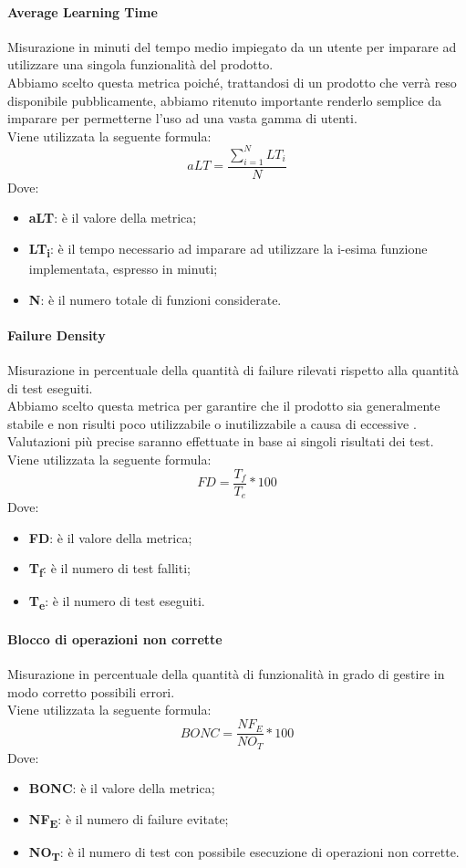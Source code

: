 \paragraph{Average Learning Time}\Spazio
Misurazione in minuti del tempo medio impiegato da un utente per imparare ad utilizzare una singola funzionalità del prodotto.
\\Abbiamo scelto questa metrica poiché, trattandosi di un prodotto che verrà reso disponibile pubblicamente, abbiamo ritenuto importante renderlo semplice da imparare per permetterne l'uso ad una vasta gamma di utenti.
\\Viene utilizzata la seguente formula:
$$aLT=\frac{\sum\limits_{i=1}^N{LT_i}}{N}$$
Dove:
\begin{itemize}
	\item{\textbf{aLT}: è il valore della metrica;}
	\item{\textbf{LT\textsubscript{i}}: è il tempo necessario ad imparare ad utilizzare la i-esima funzione implementata, espresso in minuti;}
	\item{\textbf{N}: è il numero totale di funzioni considerate.}
\end{itemize}

\paragraph{Failure Density}\Spazio
Misurazione in percentuale della quantità di failure rilevati rispetto alla quantità di test eseguiti.
\\Abbiamo scelto questa metrica per garantire che il prodotto sia generalmente stabile e non risulti poco utilizzabile o inutilizzabile a causa di eccessive . Valutazioni più precise saranno effettuate in base ai singoli risultati dei test.\\
Viene utilizzata la seguente formula:
$$FD=\frac{T_f}{T_e}*100$$
Dove:
\begin{itemize}
	\item{\textbf{FD}: è il valore della metrica;}
	\item{\textbf{T\textsubscript{f}}: è il numero di test falliti;}
	\item{\textbf{T\textsubscript{e}}: è il numero di test eseguiti.}
\end{itemize}

\paragraph{Blocco di operazioni non corrette}\Spazio
Misurazione in percentuale della quantità di funzionalità in grado di gestire in modo corretto possibili errori.\\
Viene utilizzata la seguente formula:
$$BONC=\frac{NF_E}{NO_T}*100$$
Dove:
\begin{itemize}
	\item{\textbf{BONC}: è il valore della metrica;}
	\item{\textbf{NF\textsubscript{E}}: è il numero di failure evitate;}
	\item{\textbf{NO\textsubscript{T}}: è il numero di test con possibile esecuzione di operazioni non corrette.}
\end{itemize}

